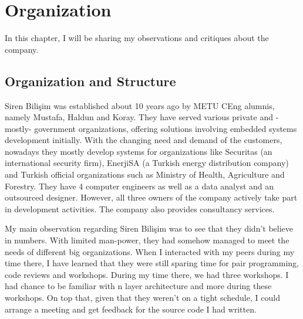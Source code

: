 \chapter{Organization}
In this chapter, I will be sharing my observations and critiques about the 
company.
\section{Organization and Structure}
Siren Bilişim was established about 10 years ago by METU CEng alumnis, namely 
Mustafa, Haldun and Koray. They have served various private and -mostly- 
government organizations, offering solutions involving embedded systems 
development initially. With the changing need and demand of the customers, 
nowadays they mostly develop systems for organizations like Securitas (an 
international security firm), EnerjiSA (a Turkish energy distribution company) 
and Turkish official organizations such as Ministry of Health, Agriculture and 
Forestry. They have 4 computer engineers as well as a data analyst and an 
outsourced designer. However, all three owners of the company actively take 
part in development activities. The company also provides consultancy services.
\par
My main observation regarding Siren Bilişim was to see that they didn't 
believe in numbers. With limited man-power, they had somehow managed to meet 
the needs of different big organizations. When I interacted with my peers 
during my time there, I have learned that they were still sparing time 
for pair programming, code reviews and workshops. During my time there, 
we had three workshops. I had chance to be familiar with n layer architecture 
and more during these workshops. On top that, given that they weren't on a 
tight schedule, I could arrange a meeting and get feedback for the source 
code I had written.